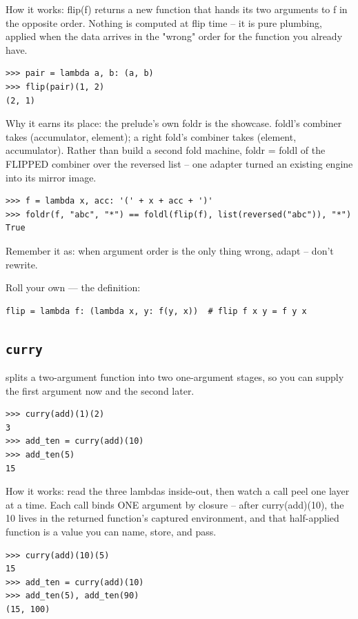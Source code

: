 \documentclass[10pt,letterpaper]{book}
\begin{document}
How it works: flip(f) returns a new function that hands its two arguments to f in the opposite order. Nothing is computed at flip time -- it is pure plumbing, applied when the data arrives in the "wrong" order for the function you already have.

\begin{lstlisting}[style=ex]
>>> pair = lambda a, b: (a, b)
>>> flip(pair)(1, 2)
(2, 1)
\end{lstlisting}

Why it earns its place: the prelude's own foldr is the showcase. foldl's combiner takes (accumulator, element); a right fold's combiner takes (element, accumulator). Rather than build a second fold machine, foldr = foldl of the FLIPPED combiner over the reversed list -- one adapter turned an existing engine into its mirror image.

\begin{lstlisting}[style=ex]
>>> f = lambda x, acc: '(' + x + acc + ')'
>>> foldr(f, "abc", "*") == foldl(flip(f), list(reversed("abc")), "*")
True
\end{lstlisting}

Remember it as: when argument order is the only thing wrong, adapt -- don't rewrite.


Roll your own --- the definition:

\begin{lstlisting}[style=ex]
flip = lambda f: (lambda x, y: f(y, x))  # flip f x y = f y x
\end{lstlisting}
\subsection{\texttt{curry}}\label{def:curry}
splits a two-argument function into two one-argument stages, so you can supply the first argument now and the second later.
\begin{lstlisting}[style=ex]
>>> curry(add)(1)(2)
3
>>> add_ten = curry(add)(10)
>>> add_ten(5)
15
\end{lstlisting}

How it works: read the three lambdas inside-out, then watch a call peel one layer at a time. Each call binds ONE argument by closure -- after curry(add)(10), the 10 lives in the returned function's captured environment, and that half-applied function is a value you can name, store, and pass.

\begin{lstlisting}[style=ex]
>>> curry(add)(10)(5)
15
>>> add_ten = curry(add)(10)
>>> add_ten(5), add_ten(90)
(15, 100)
\end{lstlisting}
\end{document}
